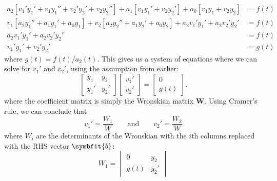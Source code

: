 \documentclass{article}
\begin{document}
\begin{appendix}
\begin{align*}
        a_2 \left[ v_1' y_1' + v_1 y_1'' + v_2' y_2' + v_2 y_2'' \right] + a_1 \left[ v_1 y_1' + v_2 y_2' \right] + a_0 \left[ v_1 y_1 + v_2 y_2 \right] & = f\left( t \right) \\
        v_1 \left[ a_2 y_1'' + a_1 y_1' + a_0 y_1 \right] + v_2 \left[ a_2 y_2'' + a_1 y_2' + a_0 y_2 \right] + a_2 v_1' y_1' + a_2 v_2' y_2'            & = f\left( t \right) \\
        a_2 v_1' y_1' + a_2 v_2' y_2'                                                                                                                    & = f\left( t \right) \\
        v_1' y_1' + v_2' y_2'                                                                                                                            & = g\left( t \right)
    \end{align*}
    where \(g\left( t \right) = f\left( t \right) / a_2\left( t \right)\).
    This gives us a system of equations where we can solve for \(v_1'\) and \(v_2'\),
    using the assumption from earlier:
    \begin{equation*}
        \begin{bmatrix}
            y_1  & y_2  \\
            y_1' & y_2'
        \end{bmatrix}
        \begin{bmatrix}
            v_1' \\
            v_2'
        \end{bmatrix}
        =
        \begin{bmatrix}
            0 \\
            g\left( t \right)
        \end{bmatrix}.
    \end{equation*}
    where the coefficient matrix is simply the Wronskian matrix \(\symbf{W}\).
    Using Cramer's rule, we can conclude that
    \begin{equation*}
        v_1' = \frac{W_1}{W} \qquad \text{and} \qquad v_2' = \frac{W_2}{W}
    \end{equation*}
    where \(W_i\) are the determinants of the Wronskian with the \(i\)th columns replaced with the RHS vector \(\symbfit{b}\):
    \begin{equation*}
        W_1 = \begin{vmatrix}
            0                 & y_2  \\
            g\left( t \right) & y_2'
        \end{vmatrix}

\end{equation*}
\end{appendix}
\end{document}
